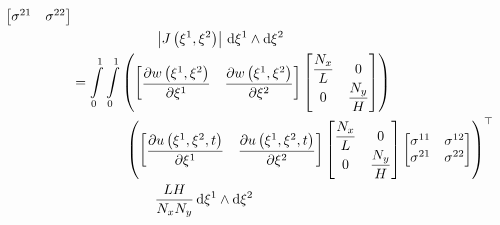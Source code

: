 \begin{equation}
\begin{aligned}
{{\begin{bmatrix}
        \ensuremath{ \sigma }^{21} & \ensuremath{ \sigma }^{22}
    \end{bmatrix}}} \\
    &\qquad\qquad\qquad\left|  J\left( \xi^{1},\xi^{2} \right)  \right| \,   \mathrm{d}   \xi^{1} \wedge   \mathrm{d}   \xi^{2}   \\ 
    &= \displaystyle\int\limits_{0}^{1}  \displaystyle\int\limits_{0}^{1} \left( \begin{bmatrix}
           \dfrac{\partial  w\left( \xi^{1},\xi^{2} \right) }{\partial \xi^{1}} & \dfrac{\partial  w\left( \xi^{1},\xi^{2} \right) }{\partial \xi^{2}} 
        \end{bmatrix}\begin{bmatrix}
          \dfrac{N_{x}}{L} & 0 \\
          0 & \dfrac{N_{y}}{H}
        \end{bmatrix} \right) \\
    &\qquad\qquad {\ensuremath{\left( \begin{bmatrix}
         \dfrac{\partial  u\left( \xi^{1},\xi^{2},t \right) }{\partial \xi^{1}} & \dfrac{\partial  u\left( \xi^{1},\xi^{2},t \right) }{\partial \xi^{2}} 
      \end{bmatrix}\begin{bmatrix}
        \dfrac{N_{x}}{L} & 0 \\
        0 & \dfrac{N_{y}}{H}
    \end{bmatrix}\begin{bmatrix}
         \sigma ^{11} &  \sigma ^{12} \\
         \sigma ^{21} &  \sigma ^{22}
    \end{bmatrix} \right)}}^{ \top } \\
    &\qquad\qquad\qquad\dfrac{LH}{N_{x}N_{y}} \,   \mathrm{d}   \xi^{1} \wedge   \mathrm{d}   \xi^{2}  
  \end{aligned}
\end{equation}

